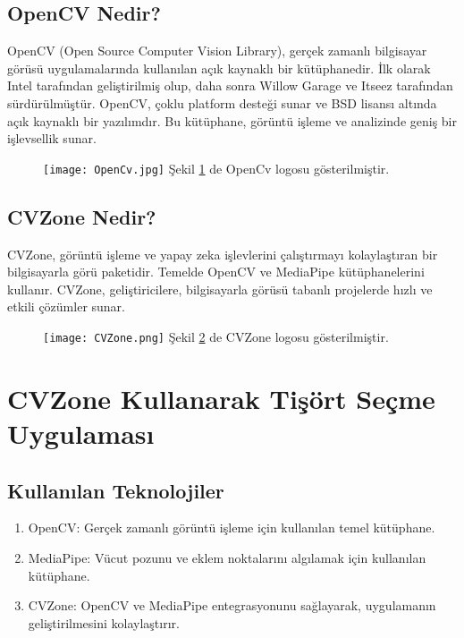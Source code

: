 \documentclass[12pt, a4paper]{article}
\begin{document}
\subsection{OpenCV Nedir?}
OpenCV (Open Source Computer Vision Library), gerçek zamanlı bilgisayar görüsü uygulamalarında kullanılan açık kaynaklı bir kütüphanedir. İlk olarak Intel tarafından geliştirilmiş olup, daha sonra Willow Garage ve Itseez tarafından sürdürülmüştür. OpenCV, çoklu platform desteği sunar ve BSD lisansı altında açık kaynaklı bir yazılımdır. Bu kütüphane, görüntü işleme ve analizinde geniş bir işlevsellik sunar.
 \begin{figure}[!ht]
	\caption{}
	\centering
	\texttt{[image: OpenCv.jpg]}
	\label{OpenCv}
	Şekil \ref{OpenCv} de OpenCv logosu gösterilmiştir\cite{OpenCvResim}.	
	
	
	
\end{figure}
\newpage
\subsection{CVZone Nedir?}
CVZone, görüntü işleme ve yapay zeka işlevlerini çalıştırmayı kolaylaştıran bir bilgisayarla görü paketidir. Temelde OpenCV ve MediaPipe kütüphanelerini kullanır. CVZone, geliştiricilere, bilgisayarla görüsü tabanlı projelerde hızlı ve etkili çözümler sunar.
 \begin{figure}[!ht]
	\caption{}
	\centering
	\texttt{[image: CVZone.png]}
	\label{CVZone}
	Şekil \ref{CVZone} de CVZone logosu gösterilmiştir\cite{CVZoneResim}.	
	
	
	
\end{figure}
\section{CVZone Kullanarak Tişört Seçme Uygulaması}
\subsection{Kullanılan Teknolojiler}
\begin{enumerate}
	\item OpenCV: Gerçek zamanlı görüntü işleme için kullanılan temel kütüphane.
	\item MediaPipe: Vücut pozunu ve eklem noktalarını algılamak için kullanılan kütüphane.
	\item CVZone: OpenCV ve MediaPipe entegrasyonunu sağlayarak, uygulamanın geliştirilmesini kolaylaştırır. 
\end{enumerate}
\end{document}
